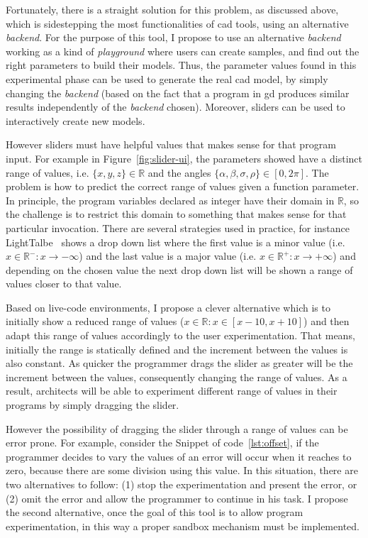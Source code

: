 Fortunately, there is a straight solution for this problem, as discussed above, which is sidestepping the most functionalities of \gls{cad} tools, using an alternative \textit{backend}. For the purpose of this tool, I propose to use an alternative \textit{backend} working as a kind of \textit{playground} where users can create samples, and find out the right parameters to build their models. Thus, the parameter values found in this experimental phase can be used to generate the real \gls{cad} model, by simply changing the \textit{backend} (based on the fact that a program in \gls{gd} produces similar results independently of the \textit{backend} chosen). Moreover, sliders can be used to interactively create new models.

However sliders must have helpful values that makes sense for that program input. For example in Figure~\ref{fig:slider-ui}, the parameters showed have a distinct range of values, i.e. $\{x,y,z\} \in \mathds{R}$ and the angles $\{\alpha,\beta, \sigma, \rho \} \in [0, 2 \pi]$. The problem is how to predict the correct range of values given a function parameter. In principle, the program variables declared as integer have their domain in $\mathds{R}$, so the challenge is to restrict this domain to something that makes sense for that particular invocation. There are several strategies used in practice, for instance LightTalbe~\citep{lighttable} shows a drop down list where the first value is a minor value (i.e. $x \in \mathds{R}^- : x \rightarrow - \infty$) and the last value is a major value (i.e. $x \in \mathds{R}^+ : x \rightarrow + \infty$) and depending on the chosen value the next drop down list will be shown a range of values closer to that value.

Based on  live-code environments, I propose a clever alternative which is to initially show a reduced range of values ($x \in \mathds{R} : x \in [x-10, x+10]$) and then adapt this range of values accordingly to the user experimentation. That means, initially the range is statically defined and the increment between the values is also constant. As quicker the programmer drags the slider as greater will be the increment between the values, consequently changing the range of values. As a result, architects will be able to experiment different range of values in their programs by simply dragging the slider.

However the possibility of dragging the slider through a range of values can be error prone. For example, consider the Snippet of code~\ref{lst:offset}, if the programmer decides to vary the values of  an error will occur when it reaches to zero, because there are some division using this value. In this situation, there are two alternatives to follow: (1) stop the experimentation and present the error, or (2) omit the error and allow the programmer to continue in his task. I propose the second alternative, once the goal of this tool is to allow program experimentation, in this way a proper sandbox mechanism must be implemented.



